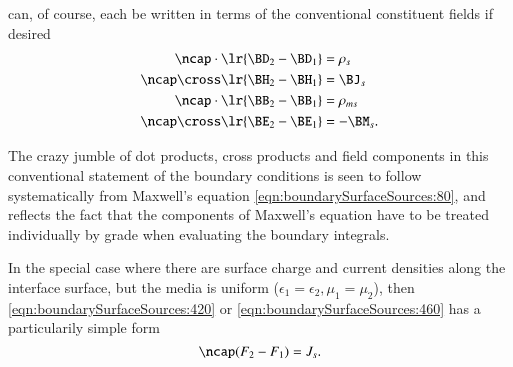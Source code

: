  can, of course,
each be written in terms of the conventional constituent fields if desired
%
%
\begin{dmath}\label{eqn:boundarySurfaceSources:460}
\begin{aligned}
\ncap \cdot \lr{ \BD_2 - \BD_1 } &= \rho_s \\
\ncap \cross \lr{ \BH_2 - \BH_1 } &= \BJ_s \\
\ncap \cdot \lr{ \BB_2 - \BB_1 } &= \rho_{ms} \\
\ncap \cross \lr{ \BE_2 - \BE_1 } &= -\BM_s.
\end{aligned}
\end{dmath}

The crazy jumble of dot products, cross products and field components in this conventional statement of the boundary conditions is seen to follow systematically from Maxwell's equation \cref{eqn:boundarySurfaceSources:80}, and reflects the fact that the components of Maxwell's equation have to be treated individually by grade when evaluating the boundary integrals.

In the special case where there are surface charge and current densities along the interface surface, but the media is uniform (\(\epsilon_1 = \epsilon_2, \mu_1 = \mu_2\)), then \cref{eqn:boundarySurfaceSources:420} or \cref{eqn:boundarySurfaceSources:460} has a particularily simple form \citep{chappell2014geometric}
\begin{dmath}\label{eqn:boundarySurfaceSources:421}
\ncap (F_2 - F_1) = J_s.
\end{dmath}

